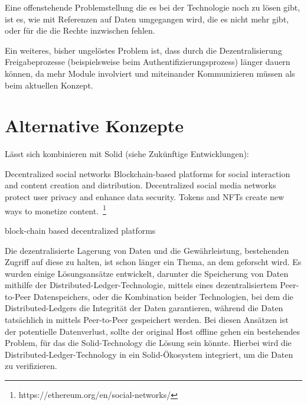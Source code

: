 \documentclass[acmtog]{acmart}
\begin{document}
Eine offenstehende Problemstellung die es bei der Technologie noch zu lösen gibt, ist es, wie mit Referenzen auf Daten umgegangen wird, die es nicht mehr gibt, oder für die die Rechte inzwischen fehlen.

Ein weiteres, bisher ungelöstes Problem ist, dass durch die Dezentralisierung Freigabeprozesse (beispielsweise beim Authentifizierungsprozess) länger dauern können, da mehr Module involviert und miteinander Kommunizieren müssen als beim aktuellen Konzept.


\label{section:alternativeKonzepte}
\section{Alternative Konzepte}
Lässt sich kombinieren mit Solid (siehe Zukünftige Entwicklungen):

Decentralized social networks
Blockchain-based platforms for social interaction and content creation and distribution.
Decentralized social media networks protect user privacy and enhance data security.
Tokens and NFTs create new ways to monetize content.~\footnote{https://ethereum.org/en/social-networks/}

block-chain based decentralized platforms~\cite{pereira2019blockchain}

Die dezentralisierte Lagerung von Daten und die Gewährleistung, bestehenden Zugriff auf diese zu halten, ist schon länger ein Thema, an dem geforscht wird. Es wurden einige Lösungsansätze entwickelt, darunter die Speicherung von Daten mithilfe der Distributed-Ledger-Technologie, mittels eines dezentralisiertem Peer-to-Peer Datenspeichers, oder die Kombination beider Technologien, bei dem die Distributed-Ledgers die Integrität der Daten garantieren, während die Daten tatsächlich in mittels Peer-to-Peer gespeichert werden. Bei diesen Ansätzen ist der potentielle Datenverlust, sollte der original Host offline gehen ein bestehendes Problem, für das die Solid-Technology die Lösung sein könnte. Hierbei wird die Distributed-Ledger-Technology in ein Solid-Ökosystem integriert, um die Daten zu verifizieren. ~\cite{ramachandran2020towards}
\end{document}
